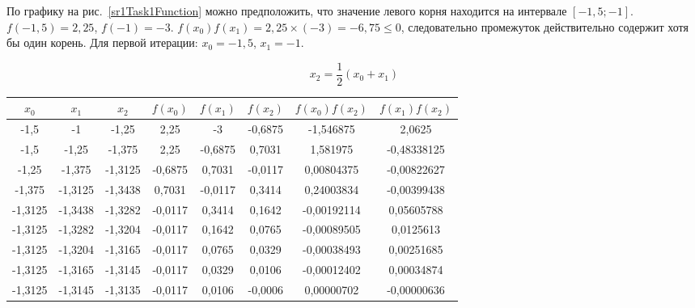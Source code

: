 \documentclass[10pt, a4paper, titlepage]{article}
\begin{document}
По графику на рис.~\ref{sr1Task1Function} можно предположить, что значение левого корня находится на интервале $[-1,5;-1]$. $f(-1,5)=2,25$, $f(-1)=-3$. $f(x_0)f(x_1)=2,25\times(-3)=-6,75\leq0$, следовательно промежуток действительно содержит хотя бы один корень. Для первой итерации: $x_0=-1,5$, $x_1=-1$.

$$x_2=\frac{1}{2}(x_0+x_1)$$

\begin{center}
    \begin{tabular}{|c|c|c|c|c|c|c|c|}
        \hline
        $x_0$ & $x_1$ & $x_2$ & $f(x_0)$ & $f(x_1)$ & $f(x_2)$ & $f(x_0)f(x_2)$ & $f(x_1)f(x_2)$ \\ \hline
        
        -1,5 & -1 & -1,25 &	2,25 & -3 & -0,6875 & -1,546875 & 2,0625 \\ \hline
        
        -1,5 & -1,25 & -1,375 & 2,25 &	-0,6875	& 0,7031 & 1,581975 & -0,48338125 \\ \hline
        
        -1,25 & -1,375 & -1,3125 & -0,6875 & 0,7031 & -0,0117 & 0,00804375 & -0,00822627 \\ \hline
        
        -1,375 & -1,3125 & -1,3438 & 0,7031 & -0,0117 &	0,3414 & 0,24003834 & -0,00399438 \\ \hline
        
        -1,3125 & -1,3438 & -1,3282 & -0,0117 & 0,3414 & 0,1642 & -0,00192114 &	0,05605788 \\ \hline
        
        -1,3125 & -1,3282 & -1,3204 & -0,0117 & 0,1642 & 0,0765 & -0,00089505 & 0,0125613 \\ \hline
        
        -1,3125 & -1,3204 & -1,3165 & -0,0117 & 0,0765 & 0,0329 & -0,00038493 & 0,00251685 \\ \hline
        
        -1,3125 & -1,3165 & -1,3145 & -0,0117 & 0,0329 & 0,0106 & -0,00012402 & 0,00034874 \\ \hline
        
        -1,3125 & -1,3145 & -1,3135 & -0,0117 & 0,0106 & -0,0006 & 0,00000702 & -0,00000636 \\ \hline
        
    \end{tabular}
\end{center}
\end{document}
